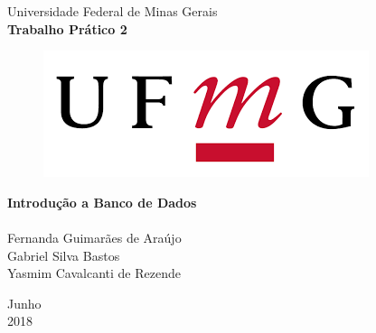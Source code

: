 \documentclass{article}
\begin{document}

\begin{titlepage}
	\begin{center}
	  
		\Huge{Universidade Federal de Minas Gerais}\\			
		\vspace{15pt}
    \vspace{95pt}
    \textbf{\LARGE{Trabalho Prático 2}}\\
		\vspace{3,5cm}
    \begin{figure}[h]
      \begin{center}
        \includegraphics[scale = 0.50]{ufmg.png}
      \end{center}
     \label{fig:graph}
    \end{figure}
    	  
	\end{center}
  
  \begin{flushleft}
		\begin{tabbing}
      \textbf {Introdução a Banco de Dados}\\
      \\
			  Fernanda Guimarães de Araújo\\
	      Gabriel Silva Bastos\\
        Yasmim Cavalcanti de Rezende
	    \end{tabbing}
  \end{flushleft}
  
	  \vspace{1cm} 
	\begin{center}
		\vspace{\fill}
		Junho\\
		2018
	\end{center}
\end{titlepage}


\newpage
\end{document}
